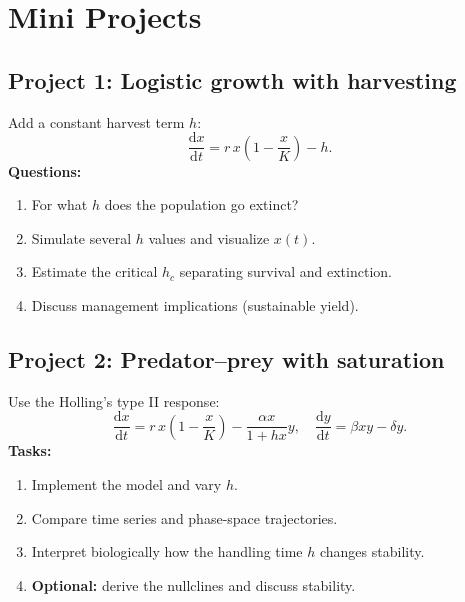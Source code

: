 \documentclass[11pt,a4paper]{article}
\newcommand{\dd}{\mathrm{d}}
\begin{document}
\section{Mini Projects}
\subsection{Project 1: Logistic growth with harvesting}
Add a constant harvest term $h$:
\[
\frac{\dd x}{\dd t} = r\,x\!\left(1-\frac{x}{K}\right) - h.
\]
\textbf{Questions:}
\begin{enumerate}[label=\alph*.,leftmargin=*]
  \item For what $h$ does the population go extinct? 
  \item Simulate several $h$ values and visualize $x(t)$.
  \item Estimate the critical $h_c$ separating survival and extinction.
  \item Discuss management implications (sustainable yield).
\end{enumerate}

\subsection{Project 2: Predator--prey with saturation}
Use the Holling's type II response:
\[
\frac{\dd x}{\dd t} = r\,x\!\left(1-\frac{x}{K}\right) - \frac{\alpha x}{1 + h x}y, \quad
\frac{\dd y}{\dd t} = \beta x y - \delta y.
\]
\textbf{Tasks:}
\begin{enumerate}[label=\alph*.,leftmargin=*]
  \item Implement the model and vary $h$.
  \item Compare time series and phase-space trajectories.
  \item Interpret biologically how the handling time $h$ changes stability.
  \item \textbf{Optional:} derive the nullclines and discuss stability.
\end{enumerate}
\end{document}
